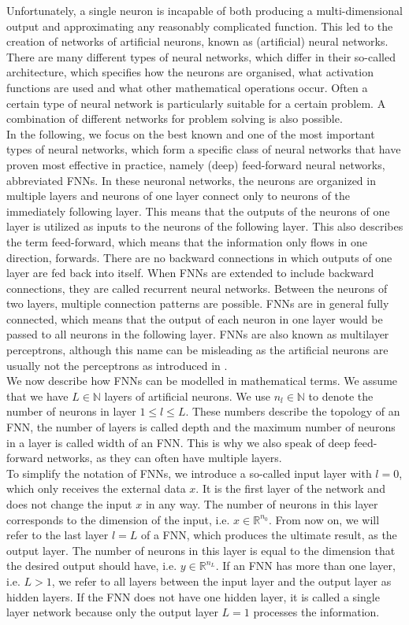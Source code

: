 Unfortunately, a single neuron is incapable of both producing a multi-dimensional output and approximating any reasonably complicated function. This led to the creation of networks of artificial neurons, known as (artificial) neural networks. There are many different types of neural networks, which differ in their so-called architecture, which specifies how the neurons are organised, what activation functions are used and what other mathematical operations occur. Often a certain type of neural network is particularly suitable for a certain problem. A combination of different networks for problem solving is also possible. \\
In the following, we focus on the best known and one of the most important types of neural networks, which form a specific class of neural networks that have proven most effective in practice, namely (deep) feed-forward neural networks, abbreviated FNNs. In these neuronal networks, the neurons are organized in multiple layers and neurons of one layer connect only to neurons of the immediately following layer. This means that the outputs of the neurons of one layer is utilized as inputs to the neurons of the following layer. This also describes the term feed-forward, which means that the information only flows in one direction, forwards. There are no backward connections in which outputs of one layer are fed back into itself. When FNNs are extended to include backward connections, they are called recurrent neural networks. Between the neurons of two layers, multiple connection patterns are possible. FNNs are in general fully connected, which means that the output of each neuron in one layer would be passed to all neurons in the following layer. FNNs are also known as multilayer perceptrons, although this name can be misleading as the artificial neurons are usually not the perceptrons as introduced in \cite{Rosenblatt:1958}. \\
We now describe how FNNs can be modelled in mathematical terms. We assume that we have $L \in \mathbb{N}$ layers of artificial neurons. We use $n_l \in \mathbb{N}$ to denote the number of neurons in layer $1 \leq l \leq L$. These numbers describe the topology of an FNN, the number of layers is called depth and the maximum number of neurons in a layer is called width of an FNN. This is why we also speak of deep feed-forward networks, as they can often have multiple layers. \\
To simplify the notation of FNNs, we introduce a so-called input layer with $l=0$, which only receives the external data $x$. It is the first layer of the network and does not change the input $x$ in any way. The number of neurons in this layer corresponds to the dimension of the input, i.e. $x \in \mathbb{R}^{n_{0}}$. From now on, we will refer to the last layer $l = L$ of a FNN, which produces the ultimate result, as the output layer. The number of neurons in this layer is equal to the dimension that the desired output should have, i.e. $y \in \mathbb{R}^{n_{L}}$. If an FNN has more than one layer, i.e. $L>1$, we refer to all layers between the input layer and the output layer as hidden layers. If the FNN does not have one hidden layer, it is called a single layer network because only the output layer $L=1$ processes the information. \\
